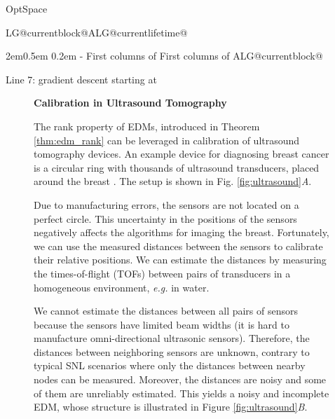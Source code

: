 \documentclass[10pt,double]{IEEEtran}
\makeatletter
\newlength{\continueindent}
\renewenvironment{algorithmic}[1][0]{\edef\ALG@numberfreq{#1}\def\@currentlabel{\theALG@line}\setcounter{ALG@line}{0}\setcounter{ALG@rem}{0}\let\\\algbreak \expandafter\edef\csname ALG@currentblock@\theALG@nested\endcsname{0}\expandafter\let\csname ALG@currentlifetime@\theALG@nested\endcsname\relax \begin{list}{\ALG@step}{\rightmargin\z@ \itemsep\z@ \itemindent\z@ \listparindent2em\partopsep\z@ \parskip\z@ \parsep\z@ \labelsep 0.5em \topsep 0.2em\ifthenelse{\equal{#1}{0}}{\labelwidth 0.5em}{\labelwidth 1.2em}\leftmargin\labelwidth \addtolength{\leftmargin}{\labelsep}
      \ALG@tlm\z@ }\parshape 2 \leftmargin \linewidth \continueindent \dimexpr\linewidth-\continueindent\relax
   \setcounter{ALG@nested}{0}\ALG@beginalgorithmic }{\ALG@closeloops \expandafter\ifnum\csname ALG@currentblock@\theALG@nested\endcsname=0\relax \else \PackageError{algorithmicx}{Some blocks are not closed!!!}{}\fi \ALG@endalgorithmic \end{list}}\makeatother
\makeatother
\begin{document}
\begin{algorithm}[t]
\caption{{\sc OptSpace} \cite{Keshavan:2010bt}} 
\label{alg:optspace} 
\begin{algorithmic}[1]
	\State 
\State 
\State  First  columns of 
  \State  First  columns of 
  \State  {}
	\State  {}
  \vspace{1mm}
	\State \Return{}
\EndFunction
\end{algorithmic}
 Line 7: gradient descent starting at 
\end{algorithm}



\begin{figure*}[t]
\selectfont
\begin{spmagbox}
\textbf{Calibration in Ultrasound Tomography}
\\
\label{sub:calibration}
\fontsize{9pt}{10pt}\selectfont




\begin{multicols}{2}


The rank property of EDMs, introduced in Theorem \ref{thm:edm_rank} can be
leveraged in calibration of ultrasound tomography devices. An example device
for diagnosing breast cancer is a circular ring with thousands of ultrasound
transducers, placed around the breast \cite{dur07}. The setup is shown in Fig.
\ref{fig:ultrasound}\textsl{A}. 

Due to manufacturing errors, the sensors are not located on a perfect circle.
This uncertainty in the positions of the sensors negatively affects the
algorithms for imaging the breast. Fortunately, we can use the measured
distances between the sensors to calibrate their relative positions. We can
estimate the distances by measuring the times-of-flight (TOFs) between pairs
of transducers in a homogeneous environment, \emph{e.g.} in water.

We cannot estimate the distances between all pairs of sensors because the
sensors have limited beam widths (it is hard to manufacture omni-directional
ultrasonic sensors). Therefore, the distances between neighboring sensors are
unknown, contrary to typical SNL scenarios where only the distances between
nearby nodes can be measured. Moreover, the distances are noisy and some of
them are unreliably estimated. This yields a noisy and incomplete EDM, whose
structure is illustrated in Figure
\ref{fig:ultrasound}\textsl{B}. 


\end{multicols}
\end{spmagbox}
\end{figure*}
\end{document}
